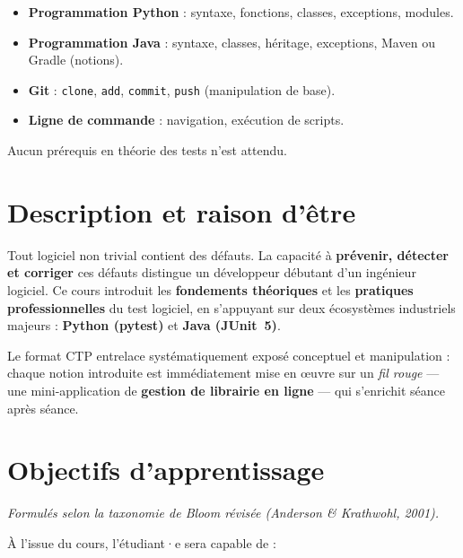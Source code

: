 \documentclass[11pt,a4paper]{article}
\begin{document}
\begin{itemize}
    \item \textbf{Programmation Python} : syntaxe, fonctions, classes, exceptions, modules.
    \item \textbf{Programmation Java} : syntaxe, classes, héritage, exceptions, Maven ou Gradle (notions).
    \item \textbf{Git} : \texttt{clone}, \texttt{add}, \texttt{commit}, \texttt{push} (manipulation de base).
    \item \textbf{Ligne de commande} : navigation, exécution de scripts.
\end{itemize}

Aucun prérequis en théorie des tests n'est attendu.

\section{Description et raison d'être}

Tout logiciel non trivial contient des défauts. La capacité à \textbf{prévenir, détecter et corriger} ces défauts distingue un développeur débutant d'un ingénieur logiciel. Ce cours introduit les \textbf{fondements théoriques} et les \textbf{pratiques professionnelles} du test logiciel, en s'appuyant sur deux écosystèmes industriels majeurs : \textbf{Python (pytest)} et \textbf{Java (JUnit~5)}.

Le format CTP entrelace systématiquement exposé conceptuel et manipulation : chaque notion introduite est immédiatement mise en \oe uvre sur un \emph{fil rouge} --- une mini-application de \textbf{gestion de librairie en ligne} --- qui s'enrichit séance après séance.

\section{Objectifs d'apprentissage}

\textit{Formulés selon la taxonomie de Bloom révisée (Anderson \& Krathwohl, 2001).}

À l'issue du cours, l'étudiant·e sera capable de :
\end{document}
